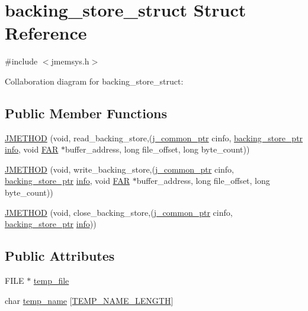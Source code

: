 \hypertarget{structbacking__store__struct}{}\section{backing\+\_\+store\+\_\+struct Struct Reference}
\label{structbacking__store__struct}


{\ttfamily \#include $<$jmemsys.\+h$>$}



Collaboration diagram for backing\+\_\+store\+\_\+struct\+:
\subsection*{Public Member Functions}
\begin{DoxyCompactItemize}
\item 
\mbox{\hyperlink{structbacking__store__struct_a22c5a1f420b61a5c3f48e857d61ceb35}{J\+M\+E\+T\+H\+OD}} (void, read\+\_\+backing\+\_\+store,(\mbox{\hyperlink{jpeglib_8h_a1a177ab705cefea8f30ec31a48e62650}{j\+\_\+common\+\_\+ptr}} cinfo, \mbox{\hyperlink{jmemsys_8h_a2e08364903e928910fa9b65ea16c19f9}{backing\+\_\+store\+\_\+ptr}} \mbox{\hyperlink{jmemsys_8h_aae47c0f1d689d6cba5eb7077ca1299fa}{info}}, void \mbox{\hyperlink{jmorecfg_8h_aef060b3456fdcc093a7210a762d5f2ed}{F\+AR}} $\ast$buffer\+\_\+address, long file\+\_\+offset, long byte\+\_\+count))
\item 
\mbox{\hyperlink{structbacking__store__struct_aa54343491f740a9d799eeb9c3e7e09d2}{J\+M\+E\+T\+H\+OD}} (void, write\+\_\+backing\+\_\+store,(\mbox{\hyperlink{jpeglib_8h_a1a177ab705cefea8f30ec31a48e62650}{j\+\_\+common\+\_\+ptr}} cinfo, \mbox{\hyperlink{jmemsys_8h_a2e08364903e928910fa9b65ea16c19f9}{backing\+\_\+store\+\_\+ptr}} \mbox{\hyperlink{jmemsys_8h_aae47c0f1d689d6cba5eb7077ca1299fa}{info}}, void \mbox{\hyperlink{jmorecfg_8h_aef060b3456fdcc093a7210a762d5f2ed}{F\+AR}} $\ast$buffer\+\_\+address, long file\+\_\+offset, long byte\+\_\+count))
\item 
\mbox{\hyperlink{structbacking__store__struct_a509740a807e120959a02d25ac245eea4}{J\+M\+E\+T\+H\+OD}} (void, close\+\_\+backing\+\_\+store,(\mbox{\hyperlink{jpeglib_8h_a1a177ab705cefea8f30ec31a48e62650}{j\+\_\+common\+\_\+ptr}} cinfo, \mbox{\hyperlink{jmemsys_8h_a2e08364903e928910fa9b65ea16c19f9}{backing\+\_\+store\+\_\+ptr}} \mbox{\hyperlink{jmemsys_8h_aae47c0f1d689d6cba5eb7077ca1299fa}{info}}))
\end{DoxyCompactItemize}
\subsection*{Public Attributes}
\begin{DoxyCompactItemize}
\item 
F\+I\+LE $\ast$ \mbox{\hyperlink{structbacking__store__struct_a90903f2f62f4fe65ac65599b50d0411e}{temp\+\_\+file}}
\item 
char \mbox{\hyperlink{structbacking__store__struct_aee24b7268410bcf129e83a8e2a2f4d45}{temp\+\_\+name}} \mbox{[}\mbox{\hyperlink{jmemsys_8h_a83c496c242b727d7c2def22f79f75d1a}{T\+E\+M\+P\+\_\+\+N\+A\+M\+E\+\_\+\+L\+E\+N\+G\+TH}}\mbox{]}
\end{DoxyCompactItemize}



